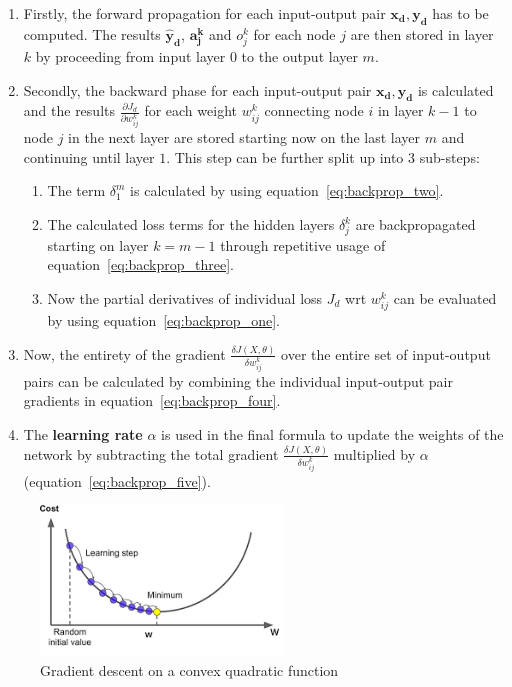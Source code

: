 \begin{enumerate}
	\item Firstly, the forward propagation for each input-output pair $ \pmb{x_d}, \pmb{y_d} $ has to be computed. The results $ \pmb{\hat{y}_d} $, $ \pmb{a_j^k} $ and $ o_j^k $ for each node $ j $ are then stored in layer $ k $ by proceeding from input layer $ 0 $ to the output layer $ m $.
	\item Secondly, the backward phase for each input-output pair $ \pmb{x_d}, \pmb{y_d} $ is calculated and the results $ \frac{\partial J_d}{\partial w_{ij}^{k}} $ for each weight $ w_{ij}^{k} $ connecting node $ i $ in layer $ k - 1 $ to node $ j $ in the next layer are stored starting now on the last layer $ m $ and continuing until layer $ 1 $. This step can be further split up into 3 sub-steps:
	\begin{enumerate}
		\item The term $ \delta_1^m $ is calculated by using equation~\ref{eq:backprop_two}.
		\item The calculated loss terms for the hidden layers $ \delta_j^k $ are backpropagated starting on layer $ k = m - 1 $ through repetitive usage of equation~\ref{eq:backprop_three}.
		\item Now the partial derivatives of individual loss $ J_d $ \gls{wrt} $ w_{ij}^k $ can be evaluated by using equation~\ref{eq:backprop_one}.
	\end{enumerate}
	\item Now, the entirety of the gradient $ \frac{\delta J(X, \theta)}{\delta w_{ij}^k} $ over the entire set of input-output pairs can be calculated by combining the individual input-output pair gradients in equation~\ref{eq:backprop_four}.
	\item The \textbf{learning rate} $ \alpha $ is used in the final formula to update the weights of the network by subtracting the total gradient $ \frac{\delta J(X, \theta)}{\delta w_{ij}^k} $ multiplied by $ \alpha $ (equation~\ref{eq:backprop_five}).
\end{enumerate}
\bigskip

\begin{figure}
	\includegraphics[height=4cm]{img/gradient_descent}
	\caption{Gradient descent on a convex quadratic function}
	\label{fig:gradient_descent}
\end{figure}

